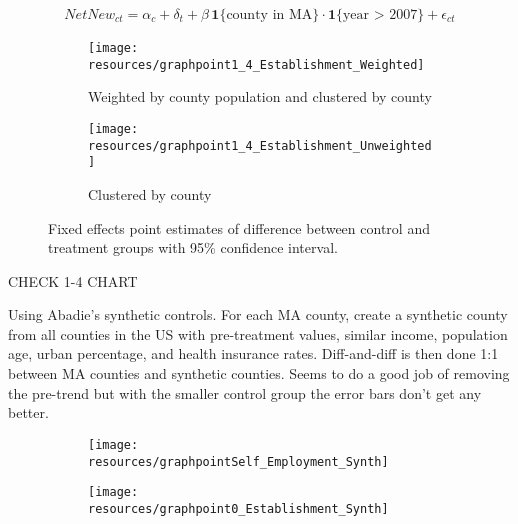 \documentclass[12pt]{article}
\begin{document}
\begin{align}
NetNew_{ct} = \alpha_c + \delta_t + \beta \, \mathbf{1}\{\text{county in MA}\} \cdot \mathbf{1}\{\text{year > 2007}\} + \epsilon_{ct}
\end{align}

\begin{center}
	\centering
	
\end{center}

\begin{figure}[H]
	\centering
	\begin{subfigure}[b]{0.495\textwidth}
	    \texttt{[image: resources/graphpoint1\_4\_Establishment\_Weighted]}
	    \caption{Weighted by county population and clustered by county}
	\end{subfigure}
	\begin{subfigure}[b]{0.495\textwidth}
		  \texttt{[image: resources/graphpoint1\_4\_Establishment\_Unweighted]}
		  \caption{Clustered by county}
	\end{subfigure}
	\caption{Fixed effects point estimates of difference between control and treatment groups with 95\% confidence interval.}
\end{figure}


\pagebreak

CHECK 1-4 CHART

Using Abadie's synthetic controls. For each MA county, create a synthetic county from all counties in the US with pre-treatment values, similar income, population age, urban percentage, and health insurance rates. Diff-and-diff is then done 1:1 between MA counties and synthetic counties. Seems to do a good job of removing the pre-trend but with the smaller control group the error bars don't get any better. 

\begin{center}
	\centering
	
\end{center}

\begin{figure}[H]
	\centering
	\begin{subfigure}[b]{0.4\textwidth}
	    \texttt{[image: resources/graphpointSelf\_Employment\_Synth]}
	\end{subfigure}
	\begin{subfigure}[b]{0.4\textwidth}
		  \texttt{[image: resources/graphpoint0\_Establishment\_Synth]}
	\end{subfigure}
\end{figure}
\end{document}
